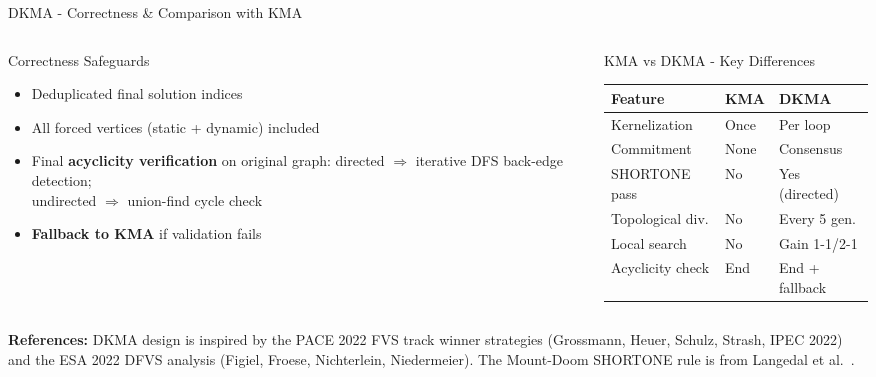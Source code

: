 \documentclass[aspectratio=169]{beamer}
\newcommand{\red}[1]{\textcolor{alertred}{\textbf{#1}}}
\renewcommand{\footnotesize}{\tiny}
\begin{document}
\begin{frame}{DKMA - Correctness \& Comparison with KMA}
	\small
	\begin{columns}[T]
		\begin{column}{0.44\textwidth}
			\begin{block}{Correctness Safeguards}
				\begin{itemize}\setlength\itemsep{2pt}
					\item Deduplicated final solution indices
					\item All forced vertices (static + dynamic) included
					\item Final \textbf{acyclicity verification} on original graph:
					      directed $\Rightarrow$ iterative DFS back-edge detection;\\
					      undirected $\Rightarrow$ union-find cycle check
					\item \red{Fallback to KMA} if validation fails
				\end{itemize}
			\end{block}
		\end{column}
		\begin{column}{0.52\textwidth}
			\begin{block}{KMA vs DKMA - Key Differences}
				\begin{tabular}{p{2.6cm}p{2.0cm}p{2.0cm}}
					\toprule
					Feature          & KMA  & DKMA           \\
					\midrule
					Kernelization    & Once & Per loop       \\
					Commitment       & None & Consensus      \\
					SHORTONE pass    & No   & Yes (directed) \\
					Topological div. & No   & Every 5 gen.   \\
					Local search     & No   & Gain 1-1/2-1   \\
					Acyclicity check & End  & End + fallback \\
					\bottomrule
				\end{tabular}
			\end{block}
		\end{column}
	\end{columns}
	\vspace{4pt}
	\begin{tcolorbox}[orangebox,fontupper=\footnotesize]
		\textbf{References:} DKMA design is inspired by the PACE 2022 FVS track
		winner strategies \cite{pace2022} (Grossmann, Heuer, Schulz, Strash, IPEC 2022)
		and the ESA 2022 DFVS analysis \cite{esa2022}
		(Figiel, Froese, Nichterlein, Niedermeier).
		The Mount-Doom SHORTONE rule is from Langedal et al.\ \cite{langedal2022}.
	\end{tcolorbox}
\end{frame}
\end{document}
